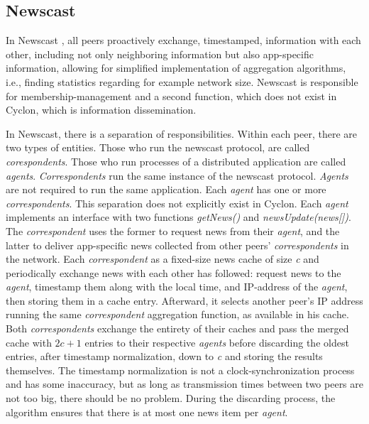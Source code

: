 \documentclass[runningheads]{llncs}
\begin{document}
\subsection{Newscast}
In Newscast \cite{newscast-computing}, all peers proactively exchange, timestamped, information with each other, including not only neighboring information but also app-specific information, allowing for simplified implementation of aggregation algorithms, i.e., finding statistics regarding for example network size. Newscast is responsible for membership-management and a second function, which does not exist in Cyclon, which is information dissemination.

In Newscast, there is a separation of responsibilities. Within each peer, there are two types of entities. Those who run the newscast protocol, are called \textit{corespondents}. Those who run processes of a distributed application are called \textit{agents}. \textit{Correspondents} run the same instance of the newscast protocol. \textit{Agents} are not required to run the same application. Each \textit{agent} has one or more \textit{correspondents}. This separation does not explicitly exist in Cyclon. Each \textit{agent} implements an interface with two functions \textit{getNews()} and \textit{newsUpdate(news[])}. The \textit{correspondent} uses the former to request news from their \textit{agent}, and the latter to deliver app-specific news collected from other peers' \textit{correspondents} in the network. Each \textit{correspondent} as a fixed-size news cache of size \textit{c} and periodically exchange news with each other has followed: request news to the \textit{agent}, timestamp them along with the local time, and IP-address of the \textit{agent}, then storing them in a cache entry. Afterward, it selects another peer's IP address running the same \textit{correspondent} aggregation function, as available in his cache. Both \textit{correspondents} exchange the entirety of their caches and pass the merged cache with $2c+1$ entries to their respective \textit{agents} before discarding the oldest entries, after timestamp normalization, down to \textit{c} and storing the results themselves. The timestamp normalization is not a clock-synchronization process and has some inaccuracy, but as long as transmission times between two peers are not too big, there should be no problem. During the discarding process, the algorithm ensures that there is at most one news item per \textit{agent}.
\end{document}
